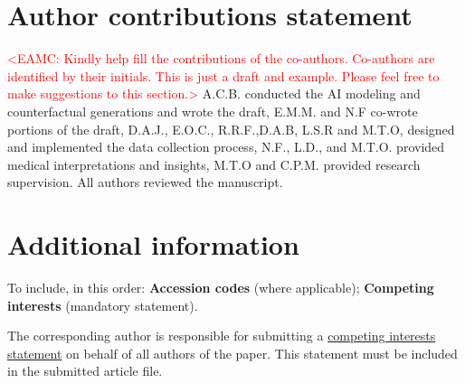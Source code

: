 \documentclass[fleqn,10pt]{wlscirep}
\begin{document}
\section*{Author contributions statement}
\textcolor{red}{<EAMC: Kindly help fill the contributions of the co-authors. Co-authors are identified by their initials. This is just a draft and example. Please feel free to make suggestions to this section.>}
A.C.B. conducted the AI modeling and counterfactual generations and wrote the draft,  
E.M.M. and N.F co-wrote portions of the draft, 
D.A.J., E.O.C., R.R.F.,D.A.B, L.S.R and M.T.O, designed and implemented the data collection process,
N.F., L.D., and M.T.O. provided medical interpretations and insights,  
M.T.O and C.P.M. provided research supervision.
All authors reviewed the manuscript. 

\section*{Additional information}
To include, in this order: \textbf{Accession codes} (where applicable); \textbf{Competing interests} (mandatory statement). 

The corresponding author is responsible for submitting a \href{http://www.nature.com/srep/policies/index.html#competing}{competing interests statement} on behalf of all authors of the paper. This statement must be included in the submitted article file.
\end{document}
